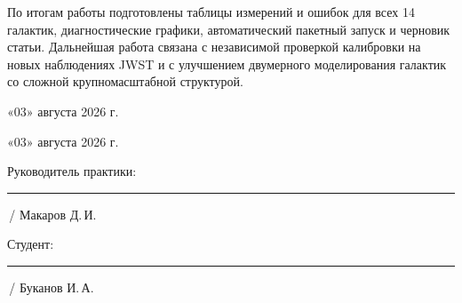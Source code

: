 \documentclass[11pt,letterpaper]{article}
\newcommand{\StudentShortName}{Буканов И.\,А.}
\newcommand{\SupervisorName}{Макаров Д.\,И.}
\newcommand{\SupervisorDate}{«03» августа 2026 г.}
\newcommand{\StudentDate}{«03» августа 2026 г.}
\begin{document}
По итогам работы подготовлены таблицы измерений и ошибок для всех 14 галактик,
диагностические графики, автоматический пакетный запуск и черновик статьи.
Дальнейшая работа связана с независимой проверкой калибровки на новых
наблюдениях JWST и с улучшением двумерного моделирования галактик со сложной
крупномасштабной структурой.

\vfill

\noindent
\begin{minipage}[t]{0.48\textwidth}
  \SupervisorDate

\vspace{11mm}

  \StudentDate
\end{minipage}%
\hfill
\begin{minipage}[t]{0.46\textwidth}
  Руководитель практики:

  \vspace{2mm}
  \rule{35mm}{0.4pt}\,/ \SupervisorName

  \vspace{8mm}

  Студент:

  \vspace{2mm}
  \rule{35mm}{0.4pt}\,/ \StudentShortName
\end{minipage}
\end{document}
